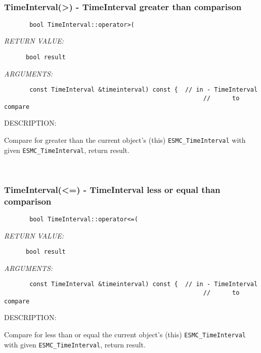 
\mbox{}\hrulefill\ 
 
\subsubsection [TimeInterval(>)] {TimeInterval(>) - TimeInterval greater than comparison}


  
\begin{verbatim}       bool TimeInterval::operator>(\end{verbatim}{\em RETURN VALUE:}
\begin{verbatim}      bool result\end{verbatim}{\em ARGUMENTS:}
\begin{verbatim}       const TimeInterval &timeinterval) const {  // in - TimeInterval
                                                       //      to compare\end{verbatim}
{\sf DESCRIPTION:\\ }


        Compare for greater than the current object's (this)
        {\tt ESMC\_TimeInterval} with given {\tt ESMC\_TimeInterval},
        return result.
   
 
\mbox{}\hrulefill\ 
 
\subsubsection [TimeInterval(<=)] {TimeInterval(<=) - TimeInterval less or equal than comparison}


  
\begin{verbatim}       bool TimeInterval::operator<=(\end{verbatim}{\em RETURN VALUE:}
\begin{verbatim}      bool result\end{verbatim}{\em ARGUMENTS:}
\begin{verbatim}       const TimeInterval &timeinterval) const {  // in - TimeInterval
                                                       //      to compare\end{verbatim}
{\sf DESCRIPTION:\\ }


        Compare for less than or equal the current object's (this)
        {\tt ESMC\_TimeInterval} with given {\tt ESMC\_TimeInterval},
        return result.
   
